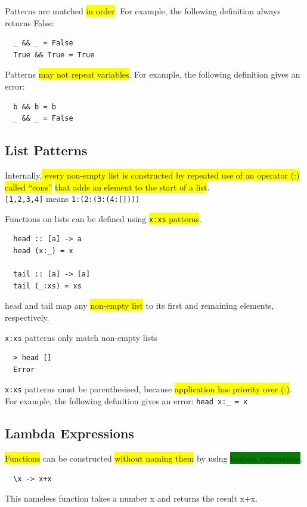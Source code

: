 \documentclass[tikz,border=10pt]{project_plan}
\begin{document}
Patterns are matched \colorbox{yellow}{in order}. For example, the
following definition always returns False:
\begin{lstlisting}
  _ && _ = False
  True && True = True
\end{lstlisting}

Patterns \colorbox{yellow}{may not repeat variables}. For example, the
following definition gives an error:
\begin{lstlisting}
  b && b = b
  _ && _ = False
\end{lstlisting}

\subsection{List Patterns}

Internally,\colorbox{yellow}{ every non-empty list is constructed by repeated
  use of an operator (:) called “cons”} \colorbox{yellow}{that adds an element
  to the start of a list}.\\
\lstinline{[1,2,3,4]} means \lstinline{1:(2:(3:(4:[])))}

Functions on lists can be defined using \colorbox{yellow}{\lstinline|x:xs| patterns}.
\begin{lstlisting}
  head :: [a] -> a
  head (x:_) = x

  tail :: [a] -> [a]
  tail (_:xs) = xs
\end{lstlisting}
head and tail map any \colorbox{yellow}{non-empty list} to its first and
remaining elements, respectively.

\lstinline|x:xs| patterns only match non-empty lists
\begin{lstlisting}
  > head []
  Error
\end{lstlisting}

\lstinline|x:xs| patterns must be parenthesised, because
\colorbox{yellow}{application has priority over (:)}. For example, the
following definition gives an error: \lstinline|head x:_ = x|

\subsection{Lambda Expressions}

\colorbox{yellow}{Functions} can be constructed \colorbox{yellow}{without naming them} by
using \colorbox{green}{lambda expressions}.

\begin{lstlisting}
  \x -> x+x
\end{lstlisting}
This nameless function takes a number x and returns the
result x+x.
\end{document}
